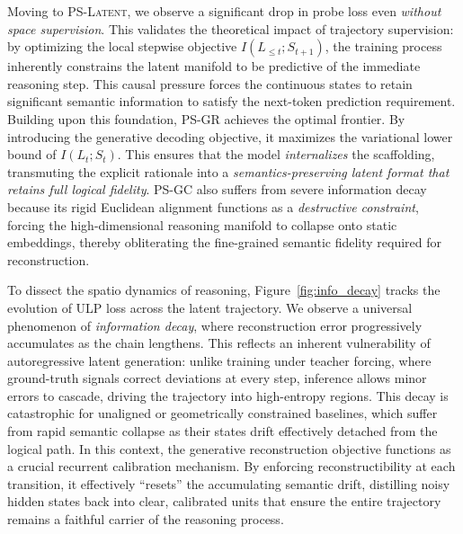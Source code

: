 Moving to \textsc{PS-Latent}, we observe a significant drop in probe loss even \textit{without space supervision}. This validates the theoretical impact of trajectory supervision: by optimizing the local stepwise objective $I(L_{\le t}; S_{t+1})$, the training process inherently constrains the latent manifold to be predictive of the immediate reasoning step. This causal pressure forces the continuous states to retain significant semantic information to satisfy the next-token prediction requirement.
Building upon this foundation, \textsc{PS-GR} achieves the optimal frontier. By introducing the generative decoding objective, it maximizes the variational lower bound of $I(L_t; S_t)$. This ensures that the model \textit{internalizes} the scaffolding, transmuting the explicit rationale into a \textit{semantics-preserving latent format that retains full logical fidelity}. \textsc{PS-GC} also suffers from severe information decay because its rigid Euclidean alignment functions as a \textit{destructive constraint}, forcing the high-dimensional reasoning manifold to collapse onto static embeddings, thereby obliterating the fine-grained semantic fidelity required for reconstruction.

To dissect the spatio dynamics of reasoning, Figure~\ref{fig:info_decay} tracks the evolution of ULP loss across the latent trajectory. We observe a universal phenomenon of \emph{information decay}, where reconstruction error progressively accumulates as the chain lengthens. 
This reflects an inherent vulnerability of autoregressive latent generation: unlike training under teacher forcing, where ground-truth signals correct deviations at every step, inference allows minor errors to cascade, driving the trajectory into high-entropy regions.
This decay is catastrophic for unaligned or geometrically constrained baselines, which suffer from rapid semantic collapse as their states drift effectively detached from the logical path. 
In this context, the generative reconstruction objective functions as a crucial recurrent calibration mechanism. By enforcing reconstructibility at each transition, it effectively ``resets'' the accumulating semantic drift, distilling noisy hidden states back into clear, calibrated units that ensure the entire trajectory remains a faithful carrier of the reasoning process.